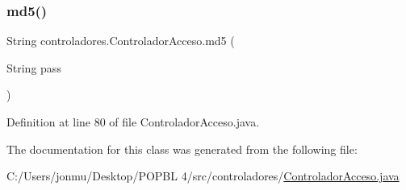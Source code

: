 \subsubsection{\texorpdfstring{md5()}{md5()}}
{\footnotesize\ttfamily String controladores.\+Controlador\+Acceso.\+md5 (\begin{DoxyParamCaption}\item[{String}]{pass }\end{DoxyParamCaption})}



Definition at line 80 of file Controlador\+Acceso.\+java.



The documentation for this class was generated from the following file\+:\begin{DoxyCompactItemize}
\item 
C\+:/\+Users/jonmu/\+Desktop/\+P\+O\+P\+B\+L 4/src/controladores/\mbox{\hyperlink{_controlador_acceso_8java}{Controlador\+Acceso.\+java}}\end{DoxyCompactItemize}
